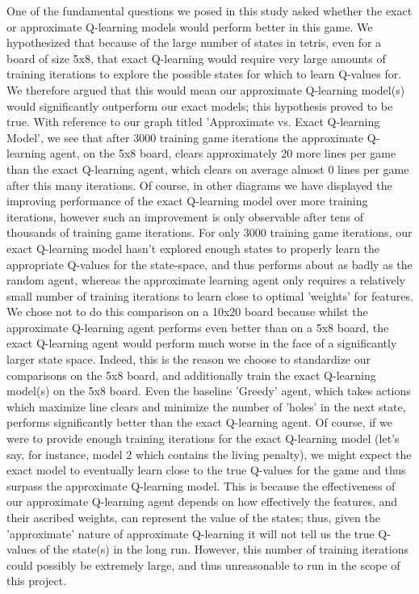 \documentclass[11pt]{article}
\begin{document}
One of the fundamental questions we posed in this study asked whether the exact or approximate Q-learning models would perform better in this game. We hypothesized that because of the large number of states in tetris, even for a board of size 5x8, that exact Q-learning would require very large amounts of training iterations to explore the possible states for which to learn Q-values for. We therefore argued that this would mean our approximate Q-learning model(s) would significantly outperform our exact models; this hypothesis proved to be true. With reference to our graph titled 'Approximate vs. Exact Q-learning Model', we see that after 3000 training game iterations the approximate Q-learning agent, on the 5x8 board, clears approximately 20 more lines per game than the exact Q-learning agent, which clears on average almost 0 lines per game after this many iterations. Of course, in other diagrams we have displayed the improving performance of the exact Q-learning model over more training iterations, however such an improvement is only observable after tens of thousands of training game iterations. For only 3000 training game iterations, our exact Q-learning model hasn't explored enough states to properly learn the appropriate Q-values for the state-space, and thus performs about as badly as the random agent, whereas the approximate learning agent only requires a relatively small number of training iterations to learn close to optimal 'weights' for features. We chose not to do this comparison on a 10x20 board because whilst the approximate Q-learning agent performs even better than on a 5x8 board, the exact Q-learning agent would perform much worse in the face of a significantly larger state space. Indeed, this is the reason we choose to standardize our comparisons on the 5x8 board, and additionally train the exact Q-learning model(s) on the 5x8 board. Even the baseline 'Greedy' agent, which takes actions which maximize line clears and minimize the number of 'holes' in the next state, performs significantly better than the exact Q-learning agent. Of course, if we were to provide enough training iterations for the exact Q-learning model (let's say, for instance, model 2 which contains the living penalty), we might expect the exact model to eventually learn close to the true Q-values for the game and thus surpass the approximate Q-learning model. This is because the effectiveness of our approximate Q-learning agent depends on how effectively the features, and their ascribed weights, can represent the value of the states; thus, given the 'approximate' nature of approximate Q-learning it will not tell us the true Q-values of the state(s) in the long run. However, this number of training iterations could possibly be extremely large, and thus  unreasonable to run in the scope of this project.
\end{document}
